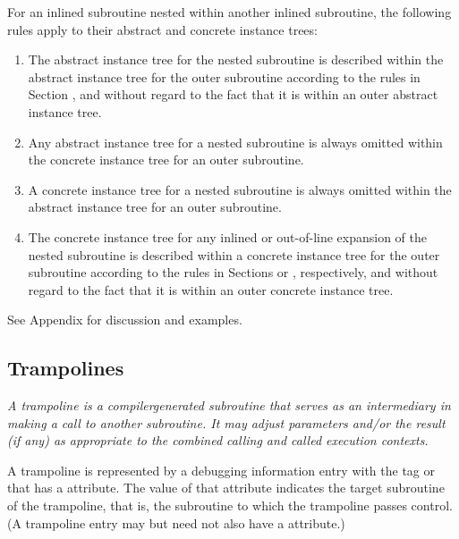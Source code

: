 For an inlined subroutine nested within another inlined
subroutine, the following rules apply to their abstract and
concrete instance trees:

\begin{enumerate}[1. ]
\item The abstract instance tree for the nested subroutine is
described within the abstract instance tree for the outer
subroutine according to the rules in 
Section , and
without regard to the fact that it is within an outer abstract
instance tree.

\item Any abstract instance tree for a nested subroutine is
always omitted within the concrete instance tree for an
outer subroutine.

\item  A concrete instance tree for a nested subroutine is
always omitted within the abstract instance tree for an
outer subroutine.

\item The concrete instance tree for any inlined or 
out-of-line
expansion of the nested subroutine is described within a
concrete instance tree for the outer subroutine according
to the rules in 
Sections  or 
, respectively,
and without regard to the fact that it is within an outer
concrete instance tree.
\end{enumerate}

See Appendix  
for discussion and examples.

\subsection{Trampolines}
\label{chap:trampolines}

\textit{A trampoline is a compiler\dash generated subroutine that serves as
\hypertarget{chap:DWATtrampolinetargetsubroutine}{}
an intermediary in making a call to another subroutine. It may
adjust parameters and/or the result (if any) as appropriate
to the combined calling and called execution contexts.}

A trampoline is represented by a debugging information entry
with the tag \DWTAGsubprogram{} or \DWTAGinlinedsubroutine{}
that has 
a \DWATtrampoline{} attribute. 
The value of that
attribute indicates the target subroutine of the trampoline,
that is, the subroutine to which the trampoline passes
control. (A trampoline entry may but need not also have a
\DWATartificial{} attribute.)

